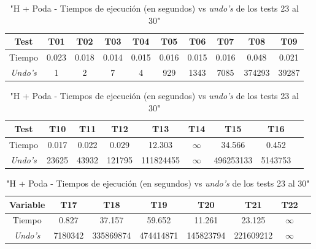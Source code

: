\documentclass[12pt]{article}
\begin{document}
\begin{center}
\begin{table}[h]
    \end{table}
    \begin{table}[h]
        \caption{"H + Poda - Tiempos de ejecución (en segundos) vs \textit{undo's} de los tests 23 al 30"}
        \centering
        \begin{tabular} {| c | c | c | c | c | c | c | c | c | c |}
            \hline
            Test & T01 & T02 & T03 & T04 & T05 & T06 & T07 & T08 & T09 \\
            \hline
            Tiempo & 0.023 & 0.018 & 0.014 & 0.015 & 0.016 & 0.015 & 0.016 & 0.048 & 0.021 \\
            \textit{Undo's} & 1 & 2 & 7 & 4 & 929 & 1343 & 7085 & 374293 & 39287 \\
            \hline
        \end{tabular}
    \end{table}
    \begin{table}[h]
        \caption{"H + Poda - Tiempos de ejecución (en segundos) vs \textit{undo's} de los tests 23 al 30"}
        \centering
        \begin{tabular} {| c | c | c | c | c | c | c | c | c |}
            \hline
            Test & T10 & T11 & T12 & T13 & T14 & T15 & T16 \\
            \hline
            Tiempo & 0.017 & 0.022 & 0.029 & 12.303 & $\infty$ & 34.566 & 0.452 \\
            \textit{Undo's} & 23625 & 43932 & 121795 & 111824455 & $\infty$ & 496253133 & 5143753 \\
            \hline
        \end{tabular}
    \end{table}
    \begin{table}[h]
        \caption{"H + Poda - Tiempos de ejecución (en segundos) vs \textit{undo's} de los tests 23 al 30"}
        \centering
        \begin{tabular} {| c | c | c | c | c | c | c | c |}
            \hline
            Variable & T17 & T18 & T19 & T20 & T21 & T22 \\
            \hline
            Tiempo & 0.827 & 37.157 & 59.652 & 11.261 & 23.125 & $\infty$ \\
            \textit{Undo's} & 7180342 & 335869874 & 474414871 & 145823794 & 221609212 & $\infty$ \\
            \hline
        \end{tabular}
    \end{table}
    \begin{table}[h]

\end{table}
\end{center}
\end{document}
